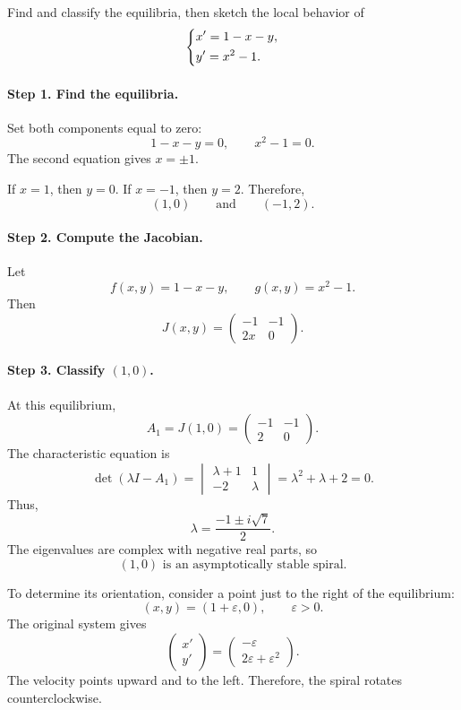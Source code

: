 \documentclass[10pt,letterpaper]{article}
\begin{document}
\begin{example}[1]{
Find and classify the equilibria, then sketch the
local behavior of
\[
\begin{dcases}
x'=1-x-y,\\
y'=x^2-1.
\end{dcases}
\]
}

\paragraph{Step 1. Find the equilibria.}
Set both components equal to zero:
\[
1-x-y=0,\qquad x^2-1=0.
\]
The second equation gives $x=\pm1$.

If $x=1$, then $y=0$.
If $x=-1$, then $y=2$.
Therefore,
\[
\boxed{(1,0)\qquad\text{and}\qquad(-1,2).}
\]

\paragraph{Step 2. Compute the Jacobian.}
Let
\[
f(x,y)=1-x-y,\qquad g(x,y)=x^2-1.
\]
Then
\[
\boxed{
J(x,y)=
\begin{pmatrix}
-1&-1\\
2x&0
\end{pmatrix}.
}
\]

\paragraph{Step 3. Classify $(1,0)$.}
At this equilibrium,
\[
A_1=J(1,0)=
\begin{pmatrix}
-1&-1\\
2&0
\end{pmatrix}.
\]
The characteristic equation is
\[
\det(\lambda I-A_1)
=
\begin{vmatrix}
\lambda+1&1\\
-2&\lambda
\end{vmatrix}
=\lambda^2+\lambda+2=0.
\]
Thus,
\[
\lambda=\frac{-1\pm i\sqrt7}{2}.
\]
The eigenvalues are complex with negative real parts, so
\[
\boxed{(1,0)\text{ is an asymptotically stable spiral}.}
\]

To determine its orientation, consider a point just
to the right of the equilibrium:
\[
(x,y)=(1+\varepsilon,0),
\qquad \varepsilon>0.
\]
The original system gives
\[
\begin{pmatrix}x'\\y'\end{pmatrix}
=
\begin{pmatrix}
-\varepsilon\\
2\varepsilon+\varepsilon^2
\end{pmatrix}.
\]
The velocity points upward and to the left.
Therefore, the spiral rotates counterclockwise.


\end{example}
\end{document}
